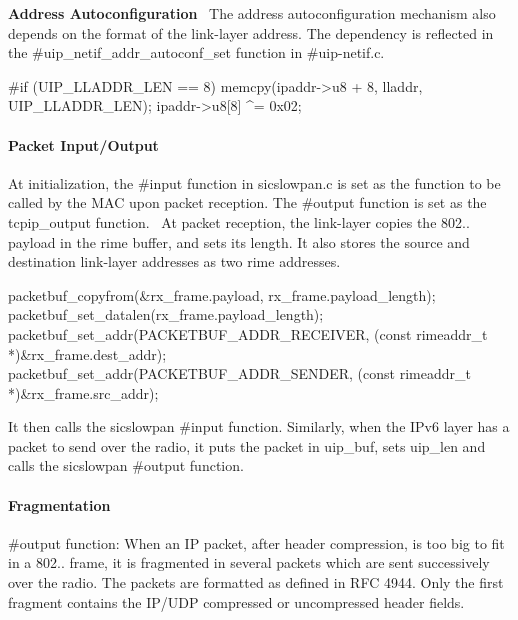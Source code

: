 {\bfseries Address Autoconfiguration}~\newline
 The address autoconfiguration mechanism also depends on the format of the link-\/layer address. The dependency is reflected in the \#uip\+\_\+netif\+\_\+addr\+\_\+autoconf\+\_\+set function in \#uip-\/netif.\+c. 
\begin{DoxyCode}
\textcolor{preprocessor}{#if (UIP\_LLADDR\_LEN == 8)}
  memcpy(ipaddr->u8 + 8, lladdr, UIP\_LLADDR\_LEN);
  ipaddr->u8[8] ^= 0x02;  
\end{DoxyCode}
\hypertarget{a00070_io}{}\paragraph{Packet Input/\+Output}\label{a00070_io}
At initialization, the \#input function in sicslowpan.\+c is set as the function to be called by the M\+AC upon packet reception. The \#output function is set as the tcpip\+\_\+output function.~\newline
 At packet reception, the link-\/layer copies the 802.. payload in the rime buffer, and sets its length. It also stores the source and destination link-\/layer addresses as two rime addresses. 
\begin{DoxyCode}
packetbuf\_copyfrom(&rx\_frame.payload, rx\_frame.payload\_length);
packetbuf\_set\_datalen(rx\_frame.payload\_length);
packetbuf\_set\_addr(PACKETBUF\_ADDR\_RECEIVER, (\textcolor{keyword}{const} rimeaddr\_t *)&rx\_frame.dest\_addr); 
packetbuf\_set\_addr(PACKETBUF\_ADDR\_SENDER, (\textcolor{keyword}{const} rimeaddr\_t *)&rx\_frame.src\_addr);
\end{DoxyCode}
 It then calls the sicslowpan \#input function. Similarly, when the I\+Pv6 layer has a packet to send over the radio, it puts the packet in uip\+\_\+buf, sets uip\+\_\+len and calls the sicslowpan \#output function.\hypertarget{a00070_frag}{}\paragraph{Fragmentation}\label{a00070_frag}
\begin{DoxyItemize}
\item \#output function\+: When an IP packet, after header compression, is too big to fit in a 802.. frame, it is fragmented in several packets which are sent successively over the radio. The packets are formatted as defined in R\+FC 4944. Only the first fragment contains the I\+P/\+U\+DP compressed or uncompressed header fields.\end{DoxyItemize}
